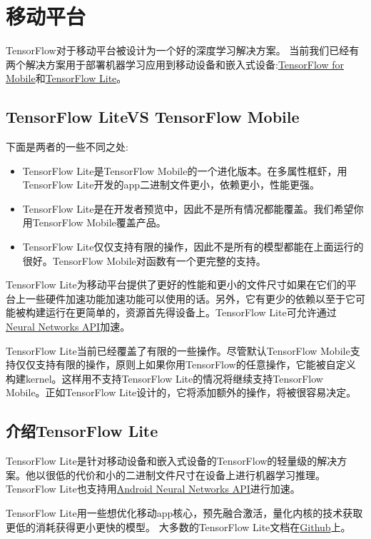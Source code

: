 \section{移动平台}
TensorFlow对于移动平台被设计为一个好的深度学习解决方案。
当前我们已经有两个解决方案用于部署机器学习应用到移动设备和嵌入式设备:\href{https://www.tensorflow.org/mobile/mobile_intro?hl=zh-cn}{TensorFlow for Mobile}和\href{https://www.tensorflow.org/mobile/tflite/index?hl=zh-cn}{TensorFlow Lite}。
\subsection{TensorFlow LiteVS TensorFlow Mobile}
下面是两者的一些不同之处:
\begin{itemize}
\item TensorFlow Lite是TensorFlow Mobile的一个进化版本。在多属性框虾，用TensorFlow Lite开发的app二进制文件更小，依赖更小，性能更强。
\item TensorFlow Lite是在开发者预览中，因此不是所有情况都能覆盖。我们希望你用TensorFlow Mobile覆盖产品。
\item TensorFlow Lite仅仅支持有限的操作，因此不是所有的模型都能在上面运行的很好。TensorFlow Mobile对函数有一个更完整的支持。
\end{itemize}
TensorFlow Lite为移动平台提供了更好的性能和更小的文件尺寸如果在它们的平台上一些硬件加速功能加速功能可以使用的话。另外，它有更少的依赖以至于它可能被构建运行在更简单的，资源首先得设备上。TensorFlow Lite可允许通过\href{https://developer.android.com/ndk/guides/neuralnetworks/index.html?hl=zh-cn}{Neural Networks API}加速。

TensorFlow Lite当前已经覆盖了有限的一些操作。尽管默认TensorFlow Mobile支持仅仅支持有限的操作，原则上如果你用TensorFlow的任意操作，它能被自定义构建kernel。这样用不支持TensorFlow Lite的情况将继续支持TensorFlow Mobile。正如TensorFlow Lite设计的，它将添加额外的操作，将被很容易决定。
\subsection{介绍TensorFlow Lite}
TensorFlow Lite是针对移动设备和嵌入式设备的TensorFlow的轻量级的解决方案。他以很低的代价和小的二进制文件尺寸在设备上进行机器学习推理。TensorFlow Lite也支持用\href{https://developer.android.com/ndk/guides/neuralnetworks/index.html?hl=zh-cn}{Android Neural Networks API}进行加速。

TensorFlow Lite用一些想优化移动app核心，预先融合激活，量化内核的技术获取更低的消耗获得更小更快的模型。
大多数的TensorFlow Lite文档在\href{https://github.com/tensorflow/tensorflow/tree/master/tensorflow/contrib/lite}{Github}上。
